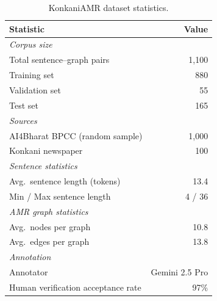 \begin{table}[t]
\centering
\small
\begin{tabular}{lr}
\toprule
\textbf{Statistic} & \textbf{Value} \\
\midrule
\multicolumn{2}{l}{\textit{Corpus size}} \\
\quad Total sentence--graph pairs & 1,100 \\
\quad Training set & 880 \\
\quad Validation set & 55 \\
\quad Test set & 165 \\
\midrule
\multicolumn{2}{l}{\textit{Sources}} \\
\quad AI4Bharat BPCC (random sample) & 1,000 \\
\quad Konkani newspaper & 100 \\
\midrule
\multicolumn{2}{l}{\textit{Sentence statistics}} \\
\quad Avg.\ sentence length (tokens) & 13.4 \\
\quad Min / Max sentence length & 4 / 36 \\
\midrule
\multicolumn{2}{l}{\textit{AMR graph statistics}} \\
\quad Avg.\ nodes per graph & 10.8 \\
\quad Avg.\ edges per graph & 13.8 \\
\midrule
\multicolumn{2}{l}{\textit{Annotation}} \\
\quad Annotator & Gemini 2.5 Pro \\
\quad Human verification acceptance rate & 97\% \\
\bottomrule
\end{tabular}
\caption{KonkaniAMR dataset statistics.}
\label{tab:dataset_stats}
\end{table}

